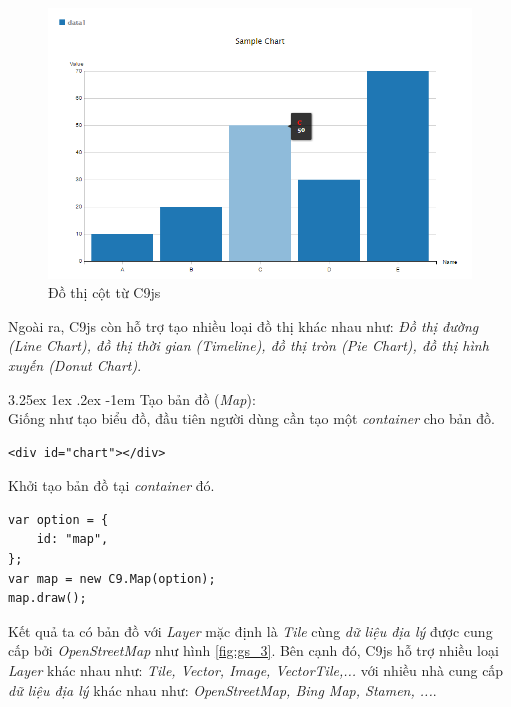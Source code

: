 \documentclass[12pt,a4paper,twoside]{article}
\makeatletter
\newcommand{\myparagraph}[1]{\paragraph{#1}\mbox{}\\} %
\renewcommand\paragraph{\@startsection{paragraph}{5}{\z@}%
  {3.25ex \@plus1ex \@minus.2ex}%
  {-1em}%
  {\normalfont\normalsize\bfseries}}
\makeatother
\begin{document}
\begin{figure}[!h]
	\begin{center}
    \includegraphics[scale=.7]{image/gs_2}
    \caption{Đồ thị cột từ C9js}
    \label{fig:gs_2}
	\end{center}
\end{figure}

Ngoài ra, C9js còn hỗ trợ tạo nhiều loại đồ thị khác nhau như: \textit{Đồ thị đường (Line Chart), đồ thị thời gian (Timeline), đồ thị tròn (Pie Chart), đồ thị hình xuyến (Donut Chart)}.

\myparagraph{Tạo bản đồ (\textit{Map}):}
Giống như tạo biểu đồ, đầu tiên người dùng cần tạo một \textit{container} cho bản đồ.

\begin{lstlisting}[caption=Tạo \textit{container} để chứa bản đồ]
<div id="chart"></div>
\end{lstlisting}

Khởi tạo bản đồ tại \textit{container} đó.

\begin{lstlisting}[caption=Khởi tạo bản đồ với C9js]
var option = {
    id: "map",
};
var map = new C9.Map(option);
map.draw();
\end{lstlisting}

Kết quả ta có bản đồ với \textit{Layer} mặc định là \textit{Tile} cùng \textit{dữ liệu địa lý} được cung cấp bởi \textit{OpenStreetMap} như hình \ref{fig:gs_3}. Bên cạnh đó, C9js hỗ trợ nhiều loại \textit{Layer} khác nhau như: \textit{Tile, Vector, Image, VectorTile,...} với nhiều nhà cung cấp \textit{dữ liệu địa lý} khác nhau như: \textit{OpenStreetMap\cite{osm}, Bing Map\cite{bingmap}, Stamen\cite{stamen}, ...}.
\end{document}
